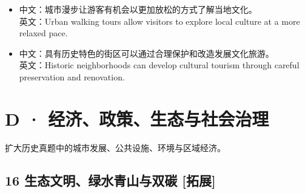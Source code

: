 \documentclass[a4paper,11pt,UTF8,fontset=none]{ctexart}
\begin{document}
\par

\begin{itemize}[leftmargin=1.7em,itemsep=1pt,parsep=0pt,topsep=2pt]
\item \noindent 中文：城市漫步让游客有机会以更加放松的方式了解当地文化。\\ 英文：Urban walking tours allow visitors to explore local culture at a more relaxed pace.\par


\item \noindent 中文：具有历史特色的街区可以通过合理保护和改造发展文化旅游。\\ 英文：Historic neighborhoods can develop cultural tourism through careful preservation and renovation.\par


\end{itemize}

\section{D · 经济、政策、生态与社会治理}

\noindent 扩大历史真题中的城市发展、公共设施、环境与区域经济。\par

\subsection{16 生态文明、绿水青山与双碳 {\color{AccentBlue} [拓展]}}
\end{document}
